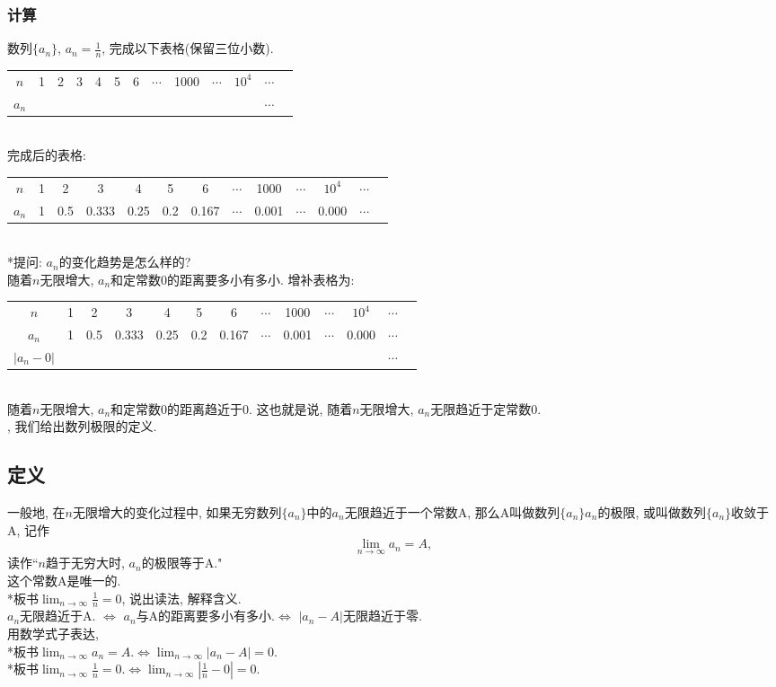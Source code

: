 \documentclass{article}
\begin{document}
\begin{CJK}{UTF8}{gkai}
\subsubsection{计算}
数列$\{a_n\}$, $a_n = \frac{1}{n}$, 完成以下表格(保留三位小数). \\
\begin{tabular}{| c | c | c | c | c | c | c | c | c | c | c | c | c |}
  $n$     & 1 & 2 & 3 & 4 & 5 & 6 & $\cdots$ & 1000 & $\cdots$ & $10^4$ & $\cdots$\\
  $a_n$ &&&&&&&&&&&$\cdots$\\  
\end{tabular}\\
完成后的表格: \\
\begin{tabular}{| c | c | c | c | c | c | c | c | c | c | c | c | c |}
  $n$     & 1 & 2 & 3 & 4 & 5 & 6 & $\cdots$ & 1000 & $\cdots$ & $10^4$ & $\cdots$\\
  $a_n$ & 1 & 0.5 & 0.333 & 0.25 & 0.2 & 0.167 & $\cdots$ & 0.001 & $\cdots$ & 0.000 & $\cdots$\\  
\end{tabular}\\
*提问: $a_n$的变化趋势是怎么样的?\\
随着$n$无限增大, $a_n$和定常数0的距离要多小有多小. 增补表格为: \\
\begin{tabular}{| c | c | c | c | c | c | c | c | c | c | c | c | c |}
  $n$     & 1 & 2 & 3 & 4 & 5 & 6 & $\cdots$ & 1000 & $\cdots$ & $10^4$ & $\cdots$\\
  $a_n$ & 1 & 0.5 & 0.333 & 0.25 & 0.2 & 0.167 & $\cdots$ & 0.001 & $\cdots$ & 0.000 & $\cdots$\\  
  $| a_n - 0 |$ &&&&&&&&&&&$\cdots$
\end{tabular}\\
随着$n$无限增大, $a_n$和定常数0的距离趋近于0. 这也就是说, 随着$n$无限增大, $a_n$无限趋近于定常数0.\\
, 我们给出数列极限的定义.\\

\subsection{定义}
一般地, 在$n$无限增大的变化过程中, 如果无穷数列$\{a_n\}$中的$a_n$无限趋近于一个常数A,  那么A叫做数列$\{a_n\}{a_n}$的极限, 或叫做数列$\{a_n\}$收敛于A, 记作$$\lim_{n \to \infty}{a_n} = A,$$
读作``$n$趋于无穷大时, $a_n$的极限等于A."\\
这个常数A是唯一的.\\
*板书$\lim_{n \to \infty}{\frac{1}{n}} = 0$, 说出读法, 解释含义.\\
\newline
$a_n$无限趋近于A. $\iff$ $a_n$与A的距离要多小有多小.$ \iff $ $|a_n - A|$无限趋近于零.\\
用数学式子表达,\\
*板书$\lim_{n \to \infty}{a_n} = A.\iff \lim_{n \to \infty}{|a_n - A|} = 0.$\\
*板书$\lim_{n \to \infty}{\frac{1}{n}} = 0.\iff \lim_{n \to \infty}{|\frac{1}{n} - 0|} = 0.$


\end{CJK}
\end{document}
